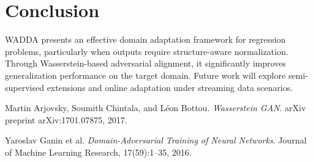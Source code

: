 \documentclass{article}
\begin{document}
\section{Conclusion}
WADDA presents an effective domain adaptation framework for regression problems, particularly when outputs require structure-aware normalization. Through Wasserstein-based adversarial alignment, it significantly improves generalization performance on the target domain. Future work will explore semi-supervised extensions and online adaptation under streaming data scenarios.


\begin{thebibliography}{9}
Martin Arjovsky, Soumith Chintala, and Léon Bottou. 
\textit{Wasserstein GAN}. arXiv preprint arXiv:1701.07875, 2017.

Yaroslav Ganin et al.
\textit{Domain-Adversarial Training of Neural Networks}.
Journal of Machine Learning Research, 17(59):1–35, 2016.
\end{thebibliography}
\end{document}
